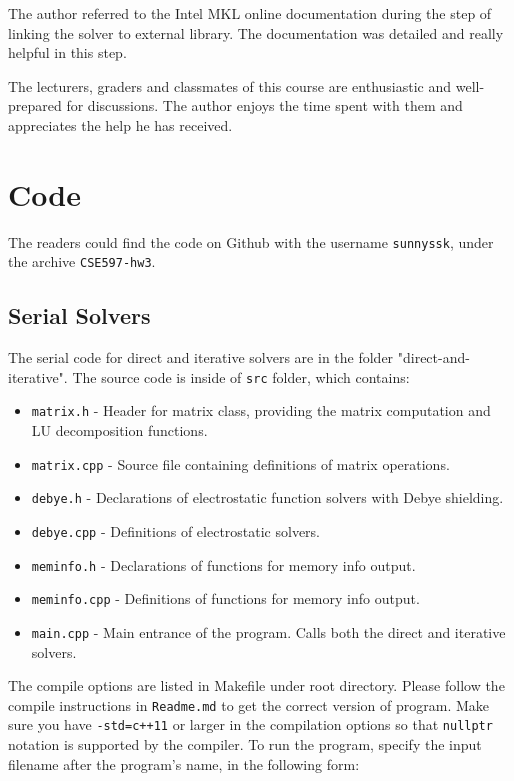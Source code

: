\documentclass{article}
\begin{document}
\begin{spacing}{1.1}
\begin{appendices}
The author referred to the Intel MKL online documentation during the step of linking the solver to external library. The documentation was detailed and really helpful in this step.

The lecturers, graders and classmates of this course are enthusiastic and well-prepared for discussions. The author enjoys the time spent with them and appreciates the help he has received.

\section{Code}

The readers could find the code on Github with the username \texttt{sunnyssk}, under the archive \texttt{CSE597-hw3}.

\subsection{Serial Solvers}

The serial code for direct and iterative solvers are in the folder "direct-and-iterative". The source code is inside of \texttt{src} folder, which contains:

\begin{itemize}
    \item \texttt{matrix.h} - Header for matrix class, providing the matrix computation and LU decomposition functions.
    \item \texttt{matrix.cpp} - Source file containing definitions of matrix operations.
    \item \texttt{debye.h} - Declarations of electrostatic function solvers with Debye shielding.
    \item \texttt{debye.cpp} - Definitions of electrostatic solvers.
    \item \texttt{meminfo.h} - Declarations of functions for memory info output.
    \item \texttt{meminfo.cpp} - Definitions of functions for memory info output.
    \item \texttt{main.cpp} - Main entrance of the program. Calls both the direct and iterative solvers.
\end{itemize}

The compile options are listed in Makefile under root directory. Please follow the compile instructions in \texttt{Readme.md} to get the correct version of program. Make sure you have \texttt{-std=c++11} or larger in the compilation options so that \texttt{nullptr} notation is supported by the compiler. To run the program, specify the input filename after the program's name, in the following form:


\end{appendices}
\end{spacing}
\end{document}
